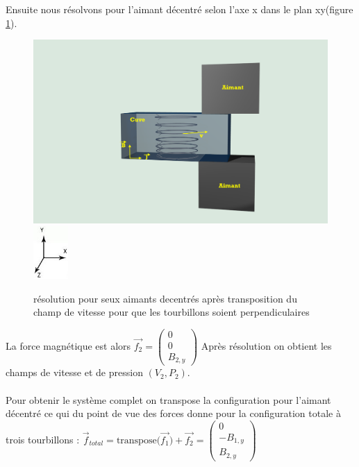 \documentclass[a4paper,12pt,titlepage]{report}
\begin{document}
\begin{onehalfspace}
\newpage
Ensuite nous résolvons pour l'aimant décentré selon l'axe x dans le plan xy(figure \ref{figure 1h}).
\begin{figure}[!h]
	\begin{center}
	\includegraphics[height = 8 cm, keepaspectratio]{graphes/champvec2.png}
	\includegraphics[height =2cm, keepaspectratio]{graphes/repere.jpg}
	\caption{résolution pour seux aimants decentrés après transposition du champ de vitesse pour que les tourbillons soient perpendiculaires}
	\label{figure 1h}
	\end{center}
\end{figure}
La force magnétique est alors $\vec{f_2} = \begin{pmatrix}
											0 \\
											0 \\
											B_{2,y}
											\end{pmatrix}$
Après résolution on obtient les champs de vitesse et de pression $(V_2, P_2)$.
\\
\\
Pour obtenir le système complet on transpose la configuration pour l'aimant décentré ce qui du point de vue des forces donne pour la configuration totale à trois tourbillons :  $\vec{f}_{total} = \text{transpose(}\vec{f_1}) + \vec{f_2}
									=		\begin{pmatrix}
											0 \\
											- B_{1,y} \\
											B_{2,y}
											\end{pmatrix}$
											


\end{onehalfspace}
\end{document}

